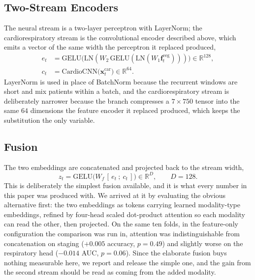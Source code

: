 \documentclass{ieeeaccess}
\begin{document}
\subsection{Two-Stream Encoders}
The neural stream is a two-layer perceptron with LayerNorm; the
cardiorespiratory stream is the convolutional encoder described above, which emits a vector
of the same width the perceptron it replaced produced,
\begin{align}
e_t&=\mathrm{GELU}\!\big(\mathrm{LN}(W_2\,\mathrm{GELU}(\mathrm{LN}(W_1\mathbf{f}^{\mathrm{eeg}}_t))) \big)\in\mathbb{R}^{128},\\
c_t&=\mathrm{CardioCNN}\big(\mathbf{x}^{\mathrm{car}}_t\big)\in\mathbb{R}^{64}.
\end{align}
LayerNorm is used in place of BatchNorm because the recurrent windows are short and mix
patients within a batch, and the cardiorespiratory stream is deliberately narrower because
the branch compresses a $7\times750$ tensor into the same $64$ dimensions the
feature encoder it replaced produced, which keeps the substitution the only variable.

\subsection{Fusion}
The two embeddings are concatenated and projected back to the stream width,
\begin{equation}
z_t=\mathrm{GELU}\!\big(W_f\,[\,e_t\ ;\ c_t\,]\big)\in\mathbb{R}^{D},\qquad D=128.
\end{equation}
This is deliberately the simplest fusion available, and it is what every number in this paper
was produced with. We arrived at it by evaluating the obvious alternative first: the two
embeddings as tokens carrying learned modality-type embeddings, refined by four-head scaled
dot-product attention so each modality can read the other, then projected. On the same ten
folds, in the feature-only configuration the comparison was run in, attention was
indistinguishable from concatenation on staging ($+0.005$ accuracy, $p=0.49$) and slightly
worse on the respiratory head ($-0.014$ AUC, $p=0.06$). Since the elaborate fusion buys
nothing measurable here, we report and release the simple one, and the gain from the second
stream should be read as coming from the added modality.
\end{document}
